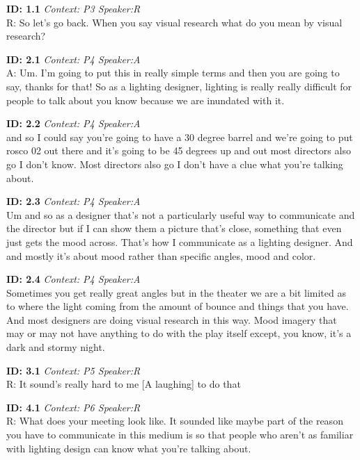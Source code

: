 \documentclass[10pt]{book}
\begin{document}
\begin{landscape}

\textbf{ID: 1.1} \emph{Context: P3 Speaker:R}\\ 
R: So let's go back. When you say visual research what do you mean by visual research? \newpage 

\textbf{ID: 2.1} \emph{Context: P4 Speaker:A}\\ 
A: Um. I'm going to put this in really simple terms and then you are going to say, thanks for that! So as a lighting designer, lighting is really really difficult for people to talk about you know because we are inundated with it. \newpage 

\textbf{ID: 2.2} \emph{Context: P4 Speaker:A}\\ 
and so I could say you're going to have a 30 degree barrel and we're going to put rosco 02 out there and it's going to be 45 degrees up and out most directors also go I don't know. Most directors also go I don't have a clue what you're talking about. \newpage 

\textbf{ID: 2.3} \emph{Context: P4 Speaker:A}\\ 
Um and so as a designer that's not a particularly useful way to communicate and the director but if I can show them a picture that's close, something that even just gets the mood across. That's how I communicate as a lighting designer. And and mostly it's about mood rather than specific angles, mood and color. \newpage 

\textbf{ID: 2.4} \emph{Context: P4 Speaker:A}\\ 
Sometimes you get really great angles but in the theater we are a bit limited as to where the light coming from the amount of bounce and things that you have. And most designers are doing visual research in this way. Mood imagery that may or may not have anything to do with the play itself except, you know, it's a dark and stormy night. \newpage 

\textbf{ID: 3.1} \emph{Context: P5 Speaker:R}\\ 
R: It sound's really hard to me [A laughing] to do that \newpage 

\textbf{ID: 4.1} \emph{Context: P6 Speaker:R}\\ 
R: What does your meeting look like. It sounded like maybe part of the reason you have to communicate in this medium is so that people who aren't as familiar with lighting design can know what you're talking about. \newpage 


\end{landscape}
\end{document}
